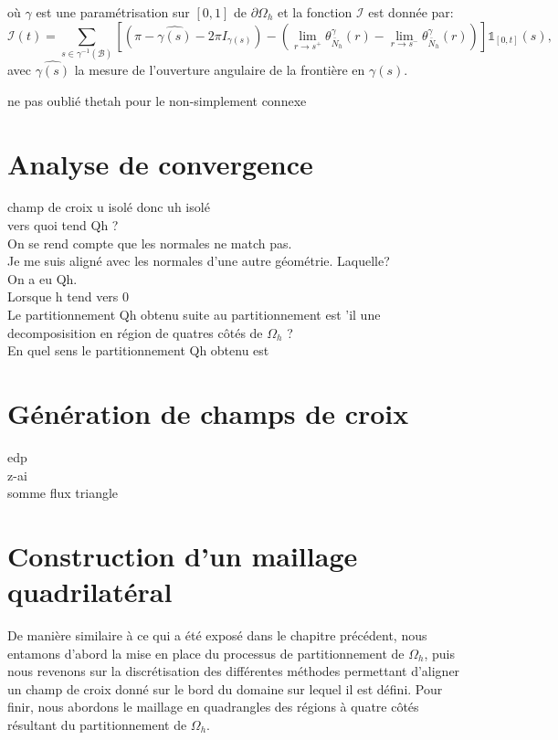 où $\gamma$ est une paramétrisation sur $[0, 1]$ de $\partial\Omega_h$ et la fonction $\mathcal{I}$ est donnée par:
$$
\mathcal{I}(t)=\displaystyle\sum_{s\in\gamma^{-1}(\mathcal{B})}\left[\left(\pi-\widehat{\gamma(s)}-2\pi I_{\gamma(s)}\right)-\left(\displaystyle\lim\limits_{r\rightarrow s^+}\theta^{\gamma}_{\bar{N}_h}(r) - \lim\limits_{r\rightarrow s^-}\theta^{\gamma}_{\bar{N}_h}(r)\right)\right]\mathbb{1}_{[0, t]}(s),
$$
avec $\widehat{\gamma(s)}$ la mesure de l'ouverture angulaire de la frontière en $\gamma(s)$.

ne pas oublié thetah pour le non-simplement connexe


\section{Analyse de convergence}


champ de croix u isolé donc uh isolé\\

vers quoi tend Qh ?\\

On se rend compte que les normales ne match pas.\\

Je me suis aligné avec les normales d'une autre géométrie. Laquelle?\\

On a eu Qh. \\

Lorsque h tend vers 0\\

Le partitionnement Qh obtenu suite au partitionnement est 'il une decomposisition en région de quatres côtés de $\Omega_h$ ?\\

En quel sens le partitionnement Qh obtenu est 


\section{Génération de champs de croix}
edp\\
z-ai\\
somme flux triangle

\section*{Construction d'un maillage quadrilatéral}
De manière similaire à ce qui a été exposé dans le chapitre précédent, nous entamons d'abord la mise en place du processus de partitionnement de $\Omega_h$, puis nous revenons sur la discrétisation des différentes méthodes permettant d'aligner un champ de croix donné sur le bord du domaine sur lequel il est défini. Pour finir, nous abordons le maillage en quadrangles des régions à quatre côtés résultant du partitionnement de $\Omega_h$.


